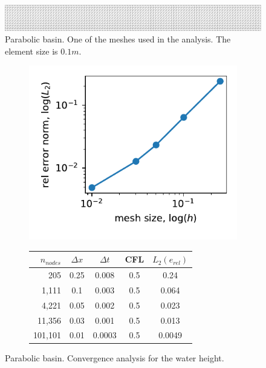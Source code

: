 \documentclass[a4paper,12pt]{elsarticle}
\begin{document}
\begin{figure}
    \includegraphics[width=\textwidth]{img/par/mesh_0.1.pdf}
    \caption{Parabolic basin. One of the meshes used in the analysis. The element size is $0.1m$.}
    \label{parabola_mesh}
\end{figure}

\begin{figure}[H]
\begin{subfigure}{0.4\textwidth}
    \includegraphics[width=\textwidth]{img/par/conv_1.pdf}    
\end{subfigure}
\hfill
\begin{subfigure}{0.58\textwidth}
    \begin{tabular}{>{\small}rcccc} \hline
    $n_{nodes}$ & $\Delta x$ & $\Delta t$ & CFL & $L_2(e_{rel})$ \\ \hline
205 & 0.25 & 0.008 & 0.5 & 0.24 \\
1,111 & 0.1 & 0.003 & 0.5 & 0.064 \\
4,221 & 0.05 & 0.002 & 0.5 & 0.023 \\
11,356 & 0.03 & 0.001 & 0.5 & 0.013 \\
101,101 & 0.01 & 0.0003 & 0.5 & 0.0049 \\
    \hline
    \end{tabular}
\end{subfigure}
\caption{Parabolic basin. Convergence analysis for the water height.}
\label{parabola_convergence}
\end{figure}
\end{document}
